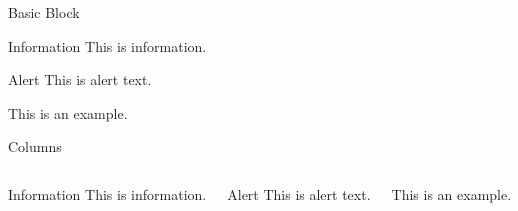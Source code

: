\documentclass{beamer}
\begin{document}
	\begin{frame}{Basic Block}
		\begin{block}{Information}
			This is information.
		\end{block}
	
		\begin{alertblock}{Alert}
			This is alert text.
		\end{alertblock}
	
		\begin{example}
			This is an example.
		\end{example}
	\end{frame}

	\begin{frame}{Columns}
		\begin{columns}
			\begin{block}{Information}
				This is information.
			\end{block}
		
			\begin{alertblock}{Alert}
				This is alert text.
			\end{alertblock}
		
			\begin{example}
				This is an example.
			\end{example}
		\end{columns}
	\end{frame}
\end{document}
